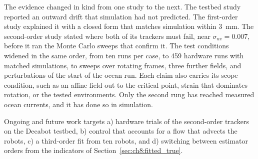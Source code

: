 The evidence changed in kind from one study to the next. The testbed study
reported an outward drift that simulation had not predicted. The
first-order study explained it with a closed form that matches simulation
within 3~mm. The second-order study stated where both of its trackers must
fail, near $\sigma_{uv} = 0.007$, before it ran the Monte Carlo sweeps that
confirm it. The test conditions widened in the same order, from ten runs
per case, to 459 hardware runs with matched simulations, to sweeps over
rotating frames, three further fields, and perturbations of the start of
the ocean run. Each claim also carries its scope condition, such as an
affine field out to the critical point, strain that dominates rotation, or
the tested environments. Only the second rung has reached measured ocean
currents, and it has done so in simulation.

Ongoing and future work targets a) hardware trials of the second-order
trackers on the Decabot testbed, b) control that accounts for a flow that
advects the robots, c) a third-order fit from ten robots, and d) switching
between estimator orders from the indicators of
Section~\ref{sec:ch8:fitted_true}.
